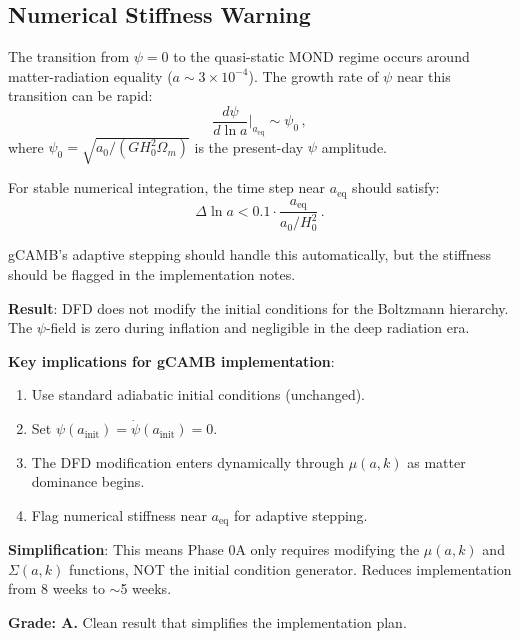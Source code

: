 \documentclass[11pt,a4paper]{article}
\begin{document}
\subsection{Numerical Stiffness Warning}

The transition from $\psi = 0$ to the quasi-static MOND regime occurs around matter-radiation equality ($a \sim 3 \times 10^{-4}$). The growth rate of $\psi$ near this transition can be rapid:
\begin{equation}
\frac{d\psi}{d\ln a}\bigg|_{a_{\mathrm{eq}}} \sim \psi_0\,,
\end{equation}
where $\psi_0 = \sqrt{a_0/(GH_0^2\Omega_m)}$ is the present-day $\psi$ amplitude.

For stable numerical integration, the time step near $a_{\mathrm{eq}}$ should satisfy:
\begin{equation}
\Delta\ln a < 0.1 \cdot \frac{a_{\mathrm{eq}}}{a_0/H_0^2}\,.
\end{equation}

gCAMB's adaptive stepping should handle this automatically, but the stiffness should be flagged in the implementation notes.

\begin{tcolorbox}[colback=green!5!white, colframe=green!60!black, title={Agent 3: Initial Conditions --- NO MODIFICATION NEEDED}]
\textbf{Result}: DFD does not modify the initial conditions for the Boltzmann hierarchy. The $\psi$-field is zero during inflation and negligible in the deep radiation era.

\textbf{Key implications for gCAMB implementation}:
\begin{enumerate}
\item Use standard adiabatic initial conditions (unchanged).
\item Set $\psi(a_{\mathrm{init}}) = \dot{\psi}(a_{\mathrm{init}}) = 0$.
\item The DFD modification enters dynamically through $\mu(a,k)$ as matter dominance begins.
\item Flag numerical stiffness near $a_{\mathrm{eq}}$ for adaptive stepping.
\end{enumerate}

\textbf{Simplification}: This means Phase 0A only requires modifying the $\mu(a,k)$ and $\Sigma(a,k)$ functions, NOT the initial condition generator. Reduces implementation from 8 weeks to $\sim$5 weeks.

\textbf{Grade: A.} Clean result that simplifies the implementation plan.
\end{tcolorbox}
\end{document}
